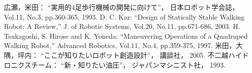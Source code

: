 ﻿\begin{thebibliography}{99}

    広瀬，米田：
    ``実用的4足歩行機械の開発に向けて''，
    日本ロボット学会誌，
    Vol.11, No.3, 
    pp.360-365, 
    1993.
    D. C. Kar: 
    ``Design of Statically Stable Walking Robot: A Review,'' 
    J. of Robotic Systems,
    Vol.20, No.11, 
    pp.671-686, 
    2003.
    H. Tsukagoshi, S. Hirose and K. Yoneda: 
    ``Maneuvering Operations of a Quadruped Walking Robot,''
    Advanced Robotics,
    Vol.11, No.4, 
    pp.359-375, 
    1997. 
    米田，大隅，坪内：
    ``ここが知りたいロボット創造設計''，
    講談社，
    2005.
    不二越ハイドロニクスチーム：
    ``新・知りたい油圧''，
    ジャパンマシニスト社，
    1993.
\end{thebibliography}
\endinput
